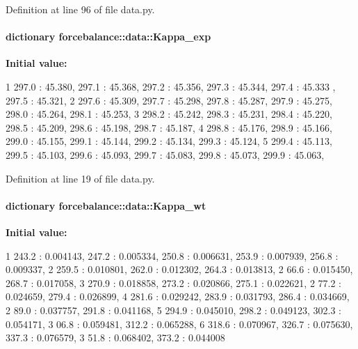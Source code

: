 \-Definition at line 96 of file data.\-py.

\hypertarget{namespaceforcebalance_1_1data_a5be737681ad8bd07bb6f3468a3894dec}{
\paragraph[{\-Kappa\-\_\-exp}]{\setlength{\rightskip}{0pt plus 5cm}dictionary {\bf forcebalance\-::data\-::\-Kappa\-\_\-exp}}}\label{namespaceforcebalance_1_1data_a5be737681ad8bd07bb6f3468a3894dec}
{\bfseries \-Initial value\-:}
\begin{DoxyCode}
1 {297.0 : 45.380, 297.1 : 45.368, 297.2 : 45.356, 297.3 : 45.344, 297.4 : 45.333
      , 297.5 : 45.321,
2                          297.6 : 45.309, 297.7 : 45.298, 297.8 : 45.287, 297.9 
      : 45.275, 298.0 : 45.264, 298.1 : 45.253,
3                          298.2 : 45.242, 298.3 : 45.231, 298.4 : 45.220, 298.5 
      : 45.209, 298.6 : 45.198, 298.7 : 45.187,
4                          298.8 : 45.176, 298.9 : 45.166, 299.0 : 45.155, 299.1 
      : 45.144, 299.2 : 45.134, 299.3 : 45.124,
5                          299.4 : 45.113, 299.5 : 45.103, 299.6 : 45.093, 299.7 
      : 45.083, 299.8 : 45.073, 299.9 : 45.063, }
\end{DoxyCode}


\-Definition at line 19 of file data.\-py.

\hypertarget{namespaceforcebalance_1_1data_a5d46dc3c4f4d9b28b236f58233a5a7f2}{
\paragraph[{\-Kappa\-\_\-wt}]{\setlength{\rightskip}{0pt plus 5cm}dictionary {\bf forcebalance\-::data\-::\-Kappa\-\_\-wt}}}\label{namespaceforcebalance_1_1data_a5d46dc3c4f4d9b28b236f58233a5a7f2}
{\bfseries \-Initial value\-:}
\begin{DoxyCode}
1 {243.2 : 0.004143, 247.2 : 0.005334, 250.8 : 0.006631, 253.9 : 0.007939, 256.8 
      : 0.009337, 
2                         259.5 : 0.010801, 262.0 : 0.012302, 264.3 : 0.013813, 2
      66.6 : 0.015450, 268.7 : 0.017058, 
3                         270.9 : 0.018858, 273.2 : 0.020866, 275.1 : 0.022621, 2
      77.2 : 0.024659, 279.4 : 0.026899, 
4                         281.6 : 0.029242, 283.9 : 0.031793, 286.4 : 0.034669, 2
      89.0 : 0.037757, 291.8 : 0.041168, 
5                         294.9 : 0.045010, 298.2 : 0.049123, 302.3 : 0.054171, 3
      06.8 : 0.059481, 312.2 : 0.065288, 
6                         318.6 : 0.070967, 326.7 : 0.075630, 337.3 : 0.076579, 3
      51.8 : 0.068402, 373.2 : 0.044008}
\end{DoxyCode}


